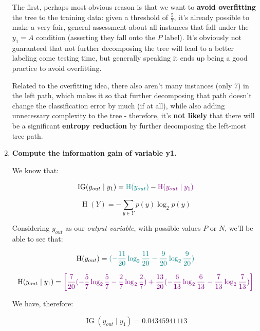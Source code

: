 \documentclass[12pt]{article}
\begin{document}
\begin{enumerate}[leftmargin=\labelsep]
        The first, perhaps most obvious reason is that we want to \textbf{avoid overfitting} the
        tree to the training data: given a threshold of $\frac{5}{7}$, it's already possible
        to make a very fair, general assessment about all instances that fall under the $y_1 = A$
        condition (asserting they fall onto the $P$ label). It's obviously not guaranteed
        that not further decomposing the tree will lead to a better labeling come testing time,
        but generally speaking it ends up being a good practice to avoid overfitting.

        Related to the overfitting idea, there also aren't many instances (only 7) in the
        left path, which makes it so that further decomposing that path doesn't change
        the classification error by much (if at all), while also adding unnecessary
        complexity to the tree - therefore, it's \textbf{not likely} that there will be a significant
        \textbf{entropy reduction} by further decomposing the left-most tree path.

  \item \textbf{Compute the information gain of variable y1.}

        We know that:

        \begin{equation}
          \operatorname{IG}(y_{out} \mid y_1) = \textcolor{teal}{\operatorname{H}(y_{out})} - \textcolor{violet}{\operatorname{H}(y_{out} \mid y_1)}
        \end{equation}

        \begin{equation}
          \operatorname{H}(Y) = -\sum_{y \in Y} p(y) \log_2 p(y)
        \end{equation}

        Considering $y_{out}$ as our \textit{output variable}, with possible values $P$ or $N$,
        we'll be able to see that:

        \begin{equation}
          \operatorname{H}(y_{out}) = \textcolor{teal}{(- \frac{11}{20} \log_2 \frac{11}{20} - \frac{9}{20} \log_2 \frac{9}{20})}
        \end{equation}

        \begin{equation}
          \operatorname{H}(y_{out} \mid y_1) = \textcolor{violet}{\left[\frac{7}{20}(- {\frac{5}{7}} \log_2 \frac{5}{7} - \frac{2}{7} \log_2 \frac{2}{7}) + \frac{13}{20}(- \frac{6}{13} \log_2 \frac{6}{13} - \frac{7}{13} \log_2 \frac{7}{13})\right]}
        \end{equation}

        We have, therefore:

        $$
          \operatorname{IG}(y_{out} \mid y_1) = 0.04345941113
        $$

\end{enumerate}
\end{document}
